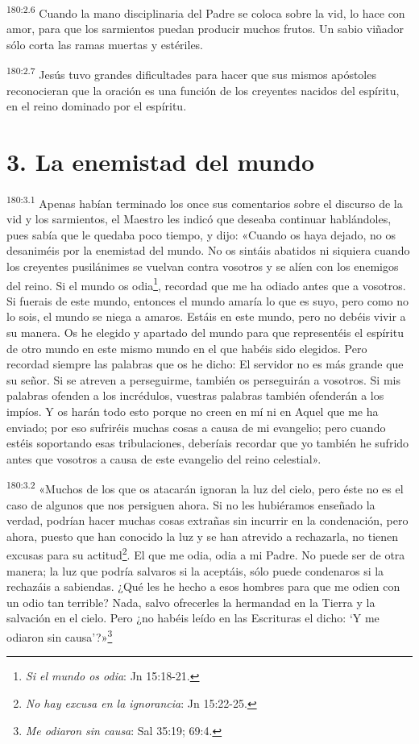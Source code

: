 \par 
\textsuperscript{180:2.6} Cuando la mano disciplinaria del Padre se coloca sobre la vid, lo hace con amor, para que los sarmientos puedan producir muchos frutos. Un sabio viñador sólo corta las ramas muertas y estériles.

\par 
\textsuperscript{180:2.7} Jesús tuvo grandes dificultades para hacer que sus mismos apóstoles reconocieran que la oración es una función de los creyentes nacidos del espíritu, en el reino dominado por el espíritu.

\section*{3. La enemistad del mundo}
\par 
\textsuperscript{180:3.1} Apenas habían terminado los once sus comentarios sobre el discurso de la vid y los sarmientos, el Maestro les indicó que deseaba continuar hablándoles, pues sabía que le quedaba poco tiempo, y dijo: «Cuando os haya dejado, no os desaniméis por la enemistad del mundo. No os sintáis abatidos ni siquiera cuando los creyentes pusilánimes se vuelvan contra vosotros y se alíen con los enemigos del reino. Si el mundo os odia\footnote{\textit{Si el mundo os odia}: Jn 15:18-21.}, recordad que me ha odiado antes que a vosotros. Si fuerais de este mundo, entonces el mundo amaría lo que es suyo, pero como no lo sois, el mundo se niega a amaros. Estáis en este mundo, pero no debéis vivir a su manera. Os he elegido y apartado del mundo para que representéis el espíritu de otro mundo en este mismo mundo en el que habéis sido elegidos. Pero recordad siempre las palabras que os he dicho: El servidor no es más grande que su señor. Si se atreven a perseguirme, también os perseguirán a vosotros. Si mis palabras ofenden a los incrédulos, vuestras palabras también ofenderán a los impíos. Y os harán todo esto porque no creen en mí ni en Aquel que me ha enviado; por eso sufriréis muchas cosas a causa de mi evangelio; pero cuando estéis soportando esas tribulaciones, deberíais recordar que yo también he sufrido antes que vosotros a causa de este evangelio del reino celestial».

\par 
\textsuperscript{180:3.2} «Muchos de los que os atacarán ignoran la luz del cielo, pero éste no es el caso de algunos que nos persiguen ahora. Si no les hubiéramos enseñado la verdad, podrían hacer muchas cosas extrañas sin incurrir en la condenación, pero ahora, puesto que han conocido la luz y se han atrevido a rechazarla, no tienen excusas para su actitud\footnote{\textit{No hay excusa en la ignorancia}: Jn 15:22-25.}. El que me odia, odia a mi Padre. No puede ser de otra manera; la luz que podría salvaros si la aceptáis, sólo puede condenaros si la rechazáis a sabiendas. ¿Qué les he hecho a esos hombres para que me odien con un odio tan terrible? Nada, salvo ofrecerles la hermandad en la Tierra y la salvación en el cielo. Pero ¿no habéis leído en las Escrituras el dicho: `Y me odiaron sin causa'?»\footnote{\textit{Me odiaron sin causa}: Sal 35:19; 69:4.}

